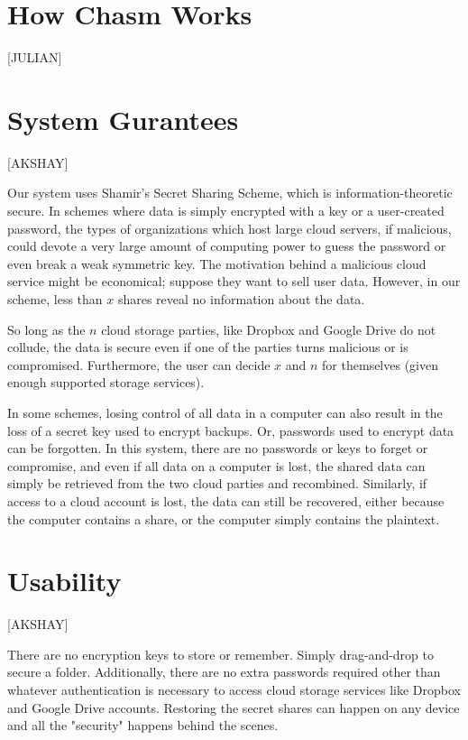 \documentclass[letterpaper,twocolumn,10pt]{article}
\begin{document}
\section{How Chasm Works}
[JULIAN]

\section{System Gurantees}
[AKSHAY]

Our system uses Shamir's Secret Sharing Scheme, which is information-theoretic secure. In schemes where data is simply encrypted with a key or a user-created password, the types of organizations which host large cloud servers, if malicious, could devote a very large amount of computing power to guess the password or even break a weak symmetric key. The motivation behind a malicious cloud service might be economical; suppose they want to sell user data. However, in our scheme, less than $x$ shares reveal no information about the data.

So long as the $n$ cloud storage parties, like Dropbox and Google Drive do not collude, the data is secure even if one of the parties turns malicious or is compromised. Furthermore, the user can decide $x$ and $n$ for themselves (given enough supported storage services).

In some schemes, losing control of all data in a computer can also result in the loss of a secret key used to encrypt backups. Or, passwords used to encrypt data can be forgotten. In this system, there are no passwords or keys to forget or compromise, and even if all data on a computer is lost, the shared data can simply be retrieved from the two cloud parties and recombined. Similarly, if access to a cloud account is lost, the data can still be recovered, either because the computer contains a share, or the computer simply contains the plaintext.

\section{Usability}
[AKSHAY]

There are no encryption keys to store or remember. Simply drag-and-drop to secure a folder. Additionally, there are no extra passwords required other than whatever authentication is necessary to access cloud storage services like Dropbox and Google Drive accounts. Restoring the secret shares can happen on any device and all the "security" happens behind the scenes.
\end{document}

